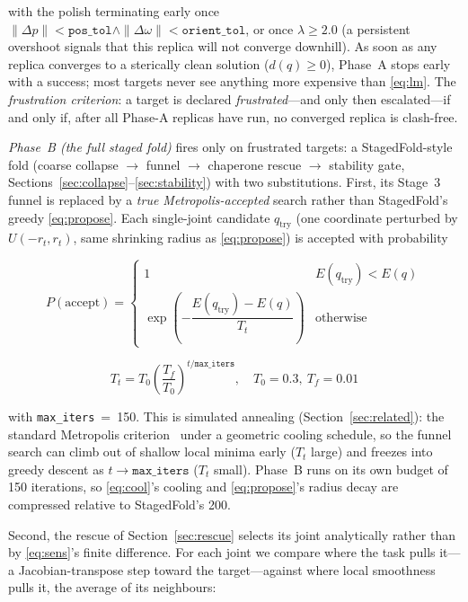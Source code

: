 \documentclass[10pt,conference]{IEEEtran}
\begin{document}
with the polish terminating early once
$\|\Delta p\| < \texttt{pos\_tol} \wedge \|\Delta\omega\| < \texttt{orient\_tol}$,
or once $\lambda \ge 2.0$ (a persistent overshoot signals that this replica will
not converge downhill). As soon as any replica converges to a sterically clean
solution ($d(q) \ge 0$), Phase~A stops early with a success; most targets never
see anything more expensive than \eqref{eq:lm}. The \emph{frustration criterion}:
a target is declared \emph{frustrated}---and only then escalated---if and only
if, after all Phase-A replicas have run, no converged replica is clash-free.

\emph{Phase~B (the full staged fold)} fires only on frustrated targets: a
StagedFold-style fold (coarse collapse $\rightarrow$ funnel $\rightarrow$
chaperone rescue $\rightarrow$ stability gate,
Sections~\ref{sec:collapse}--\ref{sec:stability}) with two substitutions. First, its Stage~3 funnel is
replaced by a \emph{true Metropolis-accepted} search rather than StagedFold's
greedy \eqref{eq:propose}. Each single-joint candidate $q_{\mathrm{try}}$ (one
coordinate perturbed by $U(-r_t, r_t)$, same shrinking radius as
\eqref{eq:propose}) is accepted with probability

\begin{equation}
P(\text{accept}) =
\begin{cases}
1 & E(q_{\mathrm{try}}) < E(q)\\[2pt]
\exp\!\left(-\dfrac{E(q_{\mathrm{try}}) - E(q)}{T_t}\right) & \text{otherwise}
\end{cases}
\label{eq:metro}
\end{equation}

\begin{equation}
T_t = T_0 \left(\frac{T_f}{T_0}\right)^{t / \texttt{max\_iters}},
\quad T_0 = 0.3,\ T_f = 0.01
\label{eq:cool}
\end{equation}

with \texttt{max\_iters}~=~150. This is simulated annealing
(Section~\ref{sec:related}): the standard Metropolis criterion~\cite{b42} under a
geometric cooling schedule, so the funnel search can climb out of shallow local
minima early ($T_t$ large) and freezes into greedy descent as
$t \rightarrow \texttt{max\_iters}$ ($T_t$ small). Phase~B runs on its own budget
of 150 iterations, so \eqref{eq:cool}'s cooling and \eqref{eq:propose}'s radius
decay are compressed relative to StagedFold's 200.

Second, the rescue of Section~\ref{sec:rescue} selects its joint analytically
rather than by \eqref{eq:sens}'s finite difference. For each joint we compare
where the task pulls it---a Jacobian-transpose step toward the target---against
where local smoothness pulls it, the average of its neighbours:
\end{document}
